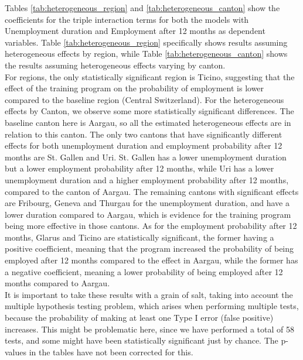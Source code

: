\documentclass{scrartcl}
\begin{document}
Tables \ref{tab:heterogeneous_region} and \ref{tab:heterogeneous_canton} show the coefficients for the triple interaction terms for both the models with Unemployment duration and Employment after 12 months as dependent variables. Table \ref{tab:heterogeneous_region} specifically shows results assuming heterogeneous effects by region, while Table \ref{tab:heterogeneous_canton} shows the results assuming heterogeneous effects varying by canton. \\

For regions, the only statistically significant region is Ticino, suggesting that the effect of the training program on the probability of employment is lower compared to the baseline region (Central Switzerland). For the heterogeneous effects by Canton, we observe some more statistically significant differences. The baseline canton here is Aargau, so all the estimated heterogeneous effects are in relation to this canton. The only two cantons that have significantly different effects for both unemployment duration and employment probability after 12 months are St. Gallen and Uri. St. Gallen has a lower unemployment duration but a lower employment probability after 12 months, while Uri has a lower unemployment duration and a higher employment probability after 12 months, compared to the canton of Aargau. The remaining cantons with significant effects are Fribourg, Geneva and Thurgau for the unemployment duration, and have a lower duration compared to Aargau, which is evidence for the training program being more effective in those cantons. As for the employment probability after 12 months, Glarus and Ticino are statistically significant, the former having a positive coefficient, meaning that the program increased the probability of being employed after 12 months compared to the effect in Aargau, while the former has a negative coefficient, meaning a lower probability of being employed after 12 months compared to Aargau. \\

It is important to take these results with a grain of salt, taking into account the multiple hypothesis testing problem, which arises when performing multiple tests, because the probability of making at least one Type I error (false positive) increases. This might be problematic here, since we have performed a total of 58 tests, and some might have been statistically significant just by chance. The p-values in the tables have not been corrected for this. 

\printbibliography
\end{document}
